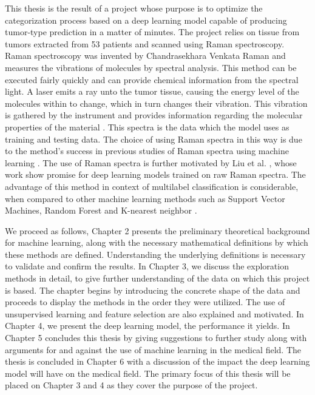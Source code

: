 This thesis is the result of a project whose purpose is to optimize the categorization process based on a deep learning model capable of producing tumor-type prediction in a matter of minutes. The project relies on tissue from tumors extracted from 53 patients and scanned using Raman spectroscopy. Raman spectroscopy was invented by Chandrasekhara Venkata Raman and measures the vibrations of molecules by spectral analysis. This method can be executed fairly quickly and can provide chemical information from the spectral light. A laser emits a ray unto the tumor tissue, causing the energy level of the molecules within to change, which in turn changes their vibration. This vibration is gathered by the instrument and provides information regarding the molecular properties of the material \cite{long1977raman}\cite{graves1989practical}. This spectra is the data which the model uses as training and testing data. The choice of using Raman spectra in this way is due to the method's success in previous studies of Raman spectra using machine learning \cite{ramanDL}\cite{ho2019rapid}. The use of Raman spectra is further motivated by Liu et al. \cite{liu2017deep}, whose work show promise for deep learning models trained on raw Raman spectra. The advantage of this method in context of multilabel classification is considerable, when compared to other machine learning methods such as Support Vector Machines, Random Forest and K-nearest neighbor \cite{liu2017deep}.

We proceed as follows, Chapter 2 presents the preliminary theoretical background for machine learning, along with the necessary mathematical definitions by which these methods are defined. Understanding the underlying definitions is necessary to validate and confirm the results. In Chapter 3, we discuss the exploration methods in detail, to give further understanding of the data on which this project is based. The chapter begins by introducing the concrete shape of the data and proceeds to display the methods in the order they were utilized. The use of unsupervised learning and feature selection are also explained and motivated. In Chapter 4, we present the deep learning model, the performance it yields. In Chapter 5 concludes this thesis by giving suggestions to further study along with arguments for and against the use of machine learning in the medical field. The thesis is concluded in Chapter 6 with a discussion of the impact the deep learning model will have on the medical field. The primary focus of this thesis will be placed on Chapter 3 and 4 as they cover the purpose of the project.